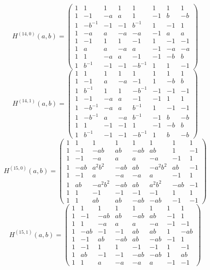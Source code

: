 \documentclass[11pt,a4paper]{article}
\theoremstyle{plain}
\theoremstyle{definition}
\numberwithin{equation}{section}
\begin{document}
\medskip
{\small\setlength{\arraycolsep}{5pt}$$H^{(14,0)}(a,b)=
\begin{pmatrix}
1&1&1&1&1&1&1&1\\1&-1&-a&a&1&-1&b&-b\\1&-b^{-1}&-1&-1&b^{-1}&1&-1&1\\1&-a&a&-a&-a&-1&a&a\\1&-1&1&1&-1&1&-1&-1\\1&a&a&-a&a&-1&-a&-a\\1&1&-a&a&-1&-1&-b&b\\1&b^{-1}&-1&-1&-b^{-1}&1&1&-1
\end{pmatrix}$$}
\medskip
{\small\setlength{\arraycolsep}{5pt}$$H^{(14,1)}(a,b)=
\begin{pmatrix}
1&1&1&1&1&1&1&1\\1&-1&a&-a&-1&1&-b&b\\1&b^{-1}&1&1&-b^{-1}&-1&-1&-1\\1&-1&-a&a&-1&-1&1&1\\1&-b^{-1}&-a&a&b^{-1}&1&-1&-1\\1&-b^{-1}&a&-a&b^{-1}&-1&b&-b\\1&1&-1&-1&1&-1&-b&b\\1&b^{-1}&-1&-1&-b^{-1}&1&b&-b
\end{pmatrix}$$}
\medskip
{\small\setlength{\arraycolsep}{5pt}$$H^{(15,0)}(a,b)=
\begin{pmatrix}
1&1&1&1&1&1&1&1\\1&-1&-ab&ab&-ab&ab&1&-1\\1&-1&-a&a&a&-a&-1&1\\1&-ab&a^{2}b^{2}&-ab&ab&-a^{2}b^{2}&ab&-1\\1&-1&a&-a&-a&a&-1&1\\1&ab&-a^{2}b^{2}&-ab&ab&a^{2}b^{2}&-ab&-1\\1&1&-1&-1&-1&-1&1&1\\1&1&ab&ab&-ab&-ab&-1&-1
\end{pmatrix}$$}
\medskip
{\small\setlength{\arraycolsep}{5pt}$$H^{(15,1)}(a,b)=
\begin{pmatrix}
1&1&1&1&1&1&1&1\\1&-1&-ab&ab&-ab&ab&-1&1\\1&1&-a&a&a&-a&-1&-1\\1&-ab&-1&-1&ab&ab&1&-ab\\1&-1&ab&-ab&ab&-ab&-1&1\\1&-1&1&1&-1&-1&1&-1\\1&ab&-1&-1&-ab&-ab&1&ab\\1&1&a&-a&-a&a&-1&-1
\end{pmatrix}$$}
\end{document}
